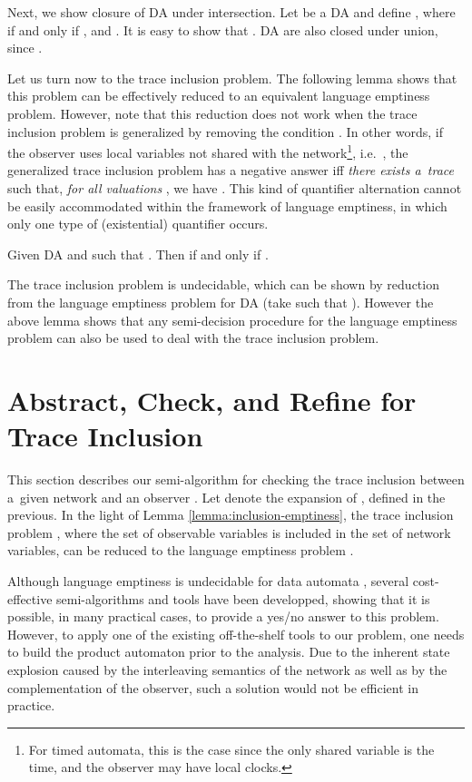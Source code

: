 \documentclass{llncs}
\begin{document}
Next, we show closure of DA under intersection. Let  be a DA and
define , where  if and only if ,  and . It is easy to show that
. DA are
also closed under union, since .



Let us turn now to the trace inclusion problem. The following lemma
shows that this problem can be effectively reduced to an equivalent
language emptiness problem. However, note that this reduction does not
work when the trace inclusion problem is generalized by removing the
condition . In other words, if the
observer uses local variables not shared with the network\footnote{For
  timed automata, this is the case since the only shared variable is
  the time, and the observer may have local clocks.}, i.e.\ , the generalized trace inclusion
problem  has a negative answer
iff \emph{there exists a~trace}  such that, \emph{for all
  valuations} , we have
. This kind of quantifier alternation cannot be
easily accommodated within the framework of language emptiness, in
which only one type of (existential) quantifier occurs.

\begin{lemma}\label{lemma:inclusion-emptiness}
  Given DA  and  such
  that . Then
   if and only if 
  . 
\end{lemma}

The trace inclusion problem is undecidable, which can be shown by
reduction from the language emptiness problem for DA (take  such
that ). However the above lemma shows that
any semi-decision procedure for the language emptiness problem can
also be used to deal with the trace inclusion problem.

\section{Abstract, Check, and Refine for Trace Inclusion}
\label{sec:algorithm}


This section describes our semi-algorithm for checking the trace
inclusion between a~given network  and an observer
. Let  denote the expansion of ,
defined in the previous. In the light of Lemma
\ref{lemma:inclusion-emptiness}, the trace inclusion problem
,
where the set of observable variables  is included in the
set of network variables, can be reduced to the language emptiness
problem .

Although language emptiness is undecidable for data automata
\cite{minsky67}, several cost-effective semi-algorithms and tools
\cite{lazy-abstraction,mcmillan06,rybal-pldi11,fast} have been
developped, showing that it is possible, in many practical cases, to
provide a yes/no answer to this problem. However, to apply one of the
existing off-the-shelf tools to our problem, one needs to build the
product automaton  prior to the
analysis. Due to the inherent state explosion caused by the
interleaving semantics of the network as well as by the
complementation of the observer, such a solution would not be
efficient in practice.
\end{document}
